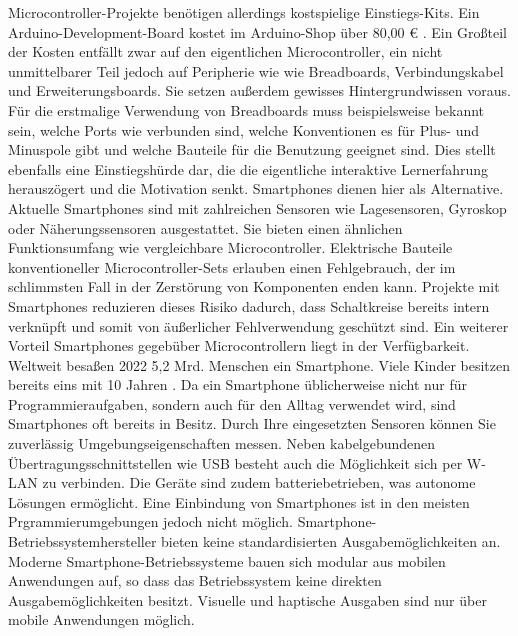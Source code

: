 \documentclass[11pt,a4paper]{report}
\begin{document}
Microcontroller-Projekte benötigen allerdings kostspielige Einstiegs-Kits.
Ein Arduino-Development-Board kostet im Arduino-Shop über 80,00 € \cite{arduino_kit}.
Ein Großteil der Kosten entfällt zwar auf den eigentlichen Microcontroller, ein nicht unmittelbarer Teil jedoch auf Peripherie wie wie Breadboards, Verbindungskabel und Erweiterungsboards.
Sie setzen außerdem gewisses Hintergrundwissen voraus.
Für die erstmalige Verwendung von Breadboards muss beispielsweise bekannt sein, welche Ports wie verbunden sind, welche Konventionen es für Plus- und Minuspole gibt und welche Bauteile für die Benutzung geeignet sind.
Dies stellt ebenfalls eine Einstiegshürde dar, die die eigentliche interaktive Lernerfahrung herauszögert und die Motivation senkt.
Smartphones dienen hier als Alternative.
Aktuelle Smartphones sind mit zahlreichen Sensoren wie Lagesensoren, Gyroskop oder Näherungssensoren ausgestattet.
Sie bieten einen ähnlichen Funktionsumfang wie vergleichbare Microcontroller.
Elektrische Bauteile konventioneller Microcontroller-Sets erlauben einen Fehlgebrauch, der im schlimmsten Fall in der Zerstörung von Komponenten enden kann.
Projekte mit Smartphones reduzieren dieses Risiko dadurch, dass Schaltkreise bereits intern verknüpft und somit von äußerlicher Fehlverwendung geschützt sind.
Ein weiterer Vorteil Smartphones gegebüber Microcontrollern liegt in der Verfügbarkeit.
Weltweit besaßen 2022 5,2 Mrd. Menschen ein Smartphone. \cite{smartphone_users}
Viele Kinder besitzen bereits eins mit 10 Jahren \cite{bitkom_smartphones}.
Da ein Smartphone üblicherweise nicht nur für Programmieraufgaben, sondern auch für den Alltag verwendet wird, sind Smartphones oft bereits in Besitz.
Durch Ihre eingesetzten Sensoren können Sie zuverlässig Umgebungseigenschaften messen.
Neben kabelgebundenen Übertragungsschnittstellen wie USB besteht auch die Möglichkeit sich per W-LAN zu verbinden.
Die Geräte sind zudem batteriebetrieben, was autonome Lösungen ermöglicht.
Eine Einbindung von Smartphones ist in den meisten Prgrammierumgebungen jedoch nicht möglich.
Smartphone-Betriebssystemhersteller bieten keine standardisierten Ausgabemöglichkeiten an.
Moderne Smartphone-Betriebssysteme bauen sich modular aus mobilen Anwendungen auf, so dass das Betriebssystem keine direkten Ausgabemöglichkeiten besitzt.
Visuelle und haptische Ausgaben sind nur über mobile Anwendungen möglich.
\end{document}
